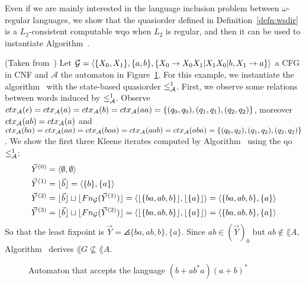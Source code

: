 Even if we are mainly interested in the language inclusion problem between
$\omega$-regular languages, we show that the quasiorder defined in Definition~\ref{defn:wsdir}
is a $L_2$-consistent computable wqo when $L_2$ is regular,
and then it can be used to instantiate Algorithm~.

\begin{example}
(Taken from~\cite{ganty2019language})
\sloppy Let $\sloppy\mathcal{G} = \angles{\{X_0,X_1\}, \{a,b\}, \{X_0 \rightarrow X_0X_1 | X_1X_0 | b, X_1 \rightarrow a\}}$
a CFG in CNF and $\mathcal{A}$ the automaton in Figure~\ref{fig:example-grammar}.
For this example, we instantiate the algorithm~ with the
state-based quasiorder $\leq^1_{\mathcal{A}}$.
First, we observe some relations between words induced by $\leq^1_{\mathcal{A}}$.
Observe $ctx_{\mathcal{A}}(\epsilon) = ctx_{\mathcal{A}}(a) = ctx_{\mathcal{A}}(b) = ctx_{\mathcal{A}}(aa) = \{(q_0,q_0), (q_1,q_1), (q_2,q_2)\}$,
moreover $ ctx_{\mathcal{A}}(ab) = ctx_{\mathcal{A}}(a)$ and $ctx_{\mathcal{A}}(ba) = ctx_{\mathcal{A}}(aa) = ctx_{\mathcal{A}}(baa) = ctx_{\mathcal{A}}(aab) = ctx_{\mathcal{A}}(aba) = \{(q_0,q_2),(q_1,q_2),(q_2,q_2)\}$.
We show the first three Kleene iterates computed by Algorithm~
using the qo $\leq^1_{\mathcal{A}}$:
\begin{equation*}
\begin{split}
\vec{Y}^{(0)} & = \langle \emptyset, \emptyset \rangle \\
\vec{Y}^{(1)} & = \lfloor \vec{b} \rfloor = \langle \{b\},\{a\} \rangle \\
\vec{Y}^{(2)} & = \lfloor \vec{b} \rfloor \sqcup \lfloor Fn_{\mathcal{G}}(\vec{Y}^{(1)}) \rfloor = \langle \lfloor \{ba,ab,b\} \rfloor,\lfloor \{a\} \rfloor \rangle = \langle \{ba,ab,b\},\{a\} \rangle \\
\vec{Y}^{(3)} & = \lfloor \vec{b} \rfloor \sqcup \lfloor Fn_{\mathcal{G}}(\vec{Y}^{(2)}) \rfloor = \langle \lfloor \{ba,ab,b\} \rfloor,\lfloor \{a\} \rfloor \rangle = \langle \{ba,ab,b\},\{a\} \rangle \\
\end{split}
\end{equation*}
So that the least fixpoint is $\vec{Y} = \angles{\{ba,ab,b\},\{a\}}$.
Since $ab \in (\vec{Y})_0$ but $ab \notin \lang{A}$, Algorithm~
derives $\lang{G} \nsubseteq \lang{A}$.
\end{example}

\begin{figure}[h]
\centering
{}
\caption{Automaton that accepts the language $(b + ab^*a)(a+b)^*$}
\label{fig:example-grammar}
\end{figure}
